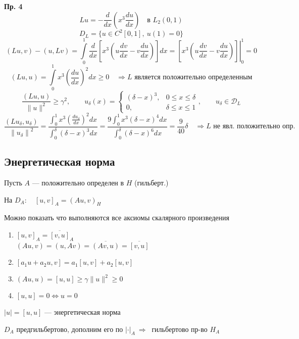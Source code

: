 \documentclass[12pt, a4paper]{article}
\begin{document}
\textbf{Пр. 4}
\[ Lu = - \frac{d }{ d x } \left(x^3 \frac{du}{dx}\right) \quad \text{в } L_2 (0,1) \]
\[ D_L = \{u \in C^2[0,1], \ u(1) = 0 \} \]
\[(Lu, v) - (u, Lv) = \int\limits_{0}^{1} \frac{d}{dx} \left[ x^3 \left(u \frac{dv }{dx } - v \frac{du }{dx } \right)  \right] dx = \left. \left[ x^3 \left(u \frac{dv }{dx } - v \frac{du }{dx } \right) \right] \right|_0^1 = 0\]
\[ (Lu, u) = \int\limits_{0}^{1} x^3 {\left(\frac{du }{dx }\right)}^2 dx \geq 0 \quad \Rightarrow L \text{ является положительно определенным} \]
\[ \frac{(Lu, u)}{\|u\|^2} \geq \gamma^2, \qquad u_\delta (x) = \begin{cases}
	(\delta - x)^3, & 0 \leq x \leq \delta \\
	0, & \delta \leq x \leq 1
\end{cases}, \qquad u_\delta \in \mathcal{D}_L  \]
\[ \frac{(Lu_\delta , u_\delta)}{{\|u_\delta\|}^2}  = \frac{\int_{0}^{1} x^3 {(\frac{du_\delta}{dx})}^2 dx}{\int_{0}^{\delta} {(\delta -x)}^3 dx} = \frac{9 \int_{0}^{1} x^3 {(\delta -x)}^4 dx}{\int_{0}^{\delta} {(\delta -x)}^6 dx} = \frac{9}{40} \delta \quad \Rightarrow L \text{ не явл. положительно опр.} \]

\newpage

\subsection{Энергетическая норма}

Пусть $A$ --- положительно определен в $H$ (гильберт.)

На $D_A: \quad {[u, v]}_A = {(A u, v)}_H$

Можно показать что выполняются все аксиомы скалярного произведения

\begin{enumerate}
	\item $ {[u, v]}_A = \overline{[v, u]}_A $ \\
		  $ (Au, v) = (u, Av) = \overline{(Av, u)} = \overline{[v, u]} $
	\item $ [a_1 u + a_2 u, v] = a_1[u, v] + a_2[u, v]$
	\item $ (Au, u) = [u, u] \geq \gamma \|u\|^2 \geq 0 $
	\item $ [u, u] = 0 \Leftrightarrow u = 0 $
\end{enumerate}

$ |u| = [u, u] $ --- энергетическая норма

$ D_A $ предгильбертово, дополним его по $ {|\boldsymbol{\cdot}|}_A \ \Rightarrow \ $ гильбертово пр-во $ H_A $
\end{document}
